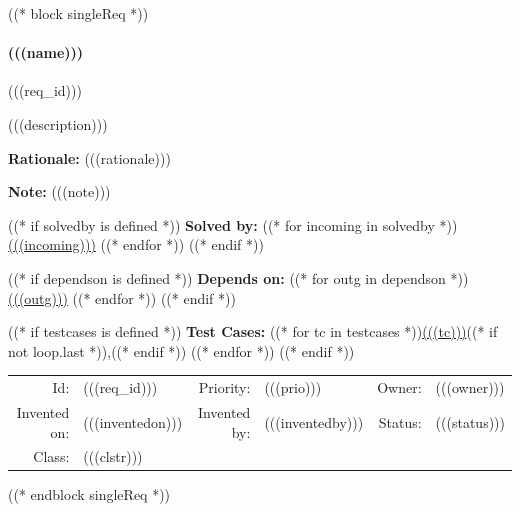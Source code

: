 ((* block singleReq *))
\paragraph{(((name)))}

\hypertarget{(((req_id)))}{(((req_id)))} 
\label{(((req_id)))}

(((description)))

\textbf{Rationale:} (((rationale)))

\textbf{Note:} (((note)))

((* if solvedby is defined *)) \textbf{Solved by:}
((* for incoming in solvedby *)) \hyperlink{(((incoming)))}{(((incoming)))} ((* endfor *))
((* endif *))

((* if dependson is defined *)) \textbf{Depends on:}
((* for outg in dependson *)) \hyperlink{(((outg)))}{(((outg)))} ((* endfor *))
((* endif *))

((* if testcases is defined *)) \textbf{Test Cases:}
((* for tc in testcases *))\hyperlink{TESTCASE(((tc)))}{(((tc)))}((* if not loop.last *)),((* endif *)) ((* endfor *))
((* endif *))

\par{\small \begin{center}
\begin{tabular}{rlrlrl}
   Id: & (((req_id)))               & Priority: & (((prio)))          & Owner: & (((owner))) \\
   Invented on: & (((inventedon))) & Invented by: & (((inventedby))) & Status: & (((status))) \\
   Class: & (((clstr)))
\end{tabular}\end{center}
}
((* endblock singleReq *))
